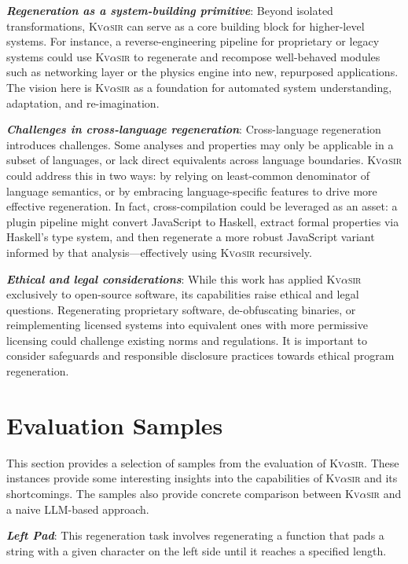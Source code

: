\documentclass[nonacm,sigplan,review]{acmart}
\newcommand{\sys}{{\scshape Kv{$\alpha$}sir}\xspace}
\newcommand{\heading}[1]{\vspace{2pt}\noindent\textbf{\emph{#1}}:\enspace}
\begin{document}
\heading{Regeneration as a system-building primitive}
Beyond isolated transformations, \sys can serve as a core building block for
higher-level systems.
For instance, a reverse-engineering pipeline for
proprietary or legacy systems could use \sys to regenerate and recompose
well-behaved modules such as networking layer or the physics engine into new,
repurposed applications.
The vision here is \sys as a foundation for automated system understanding, adaptation, and re-imagination.

\heading{Challenges in cross-language regeneration}
Cross-language regeneration introduces challenges.
Some analyses and
properties may only be applicable in a subset of languages, or lack direct
equivalents across language boundaries.
\sys could address this in two ways: by
relying on least-common denominator of language semantics, or by
embracing language-specific features to drive more effective regeneration.
In
fact, cross-compilation could be leveraged as an asset: a plugin pipeline might
convert JavaScript to Haskell, extract formal properties via Haskell’s type
system, and then regenerate a more robust JavaScript variant informed by that
analysis---effectively using \sys recursively.

\heading{Ethical and legal considerations}
While this work has applied \sys exclusively to open-source software, its
capabilities raise ethical and legal questions. Regenerating
proprietary software, de-obfuscating binaries, or reimplementing licensed
systems into equivalent ones with more permissive licensing 
could challenge existing norms and
regulations. 
It is important to consider
safeguards and responsible disclosure practices towards ethical program regeneration.




\appendix

\section{Evaluation Samples}
This section provides a selection of samples from the evaluation of \sys.
These instances provide some interesting insights into the capabilities of \sys and its shortcomings.
The samples also provide concrete comparison between \sys and a naive LLM-based approach.

\heading{Left Pad}
This regeneration task involves regenerating a
function that pads a string with a given character on the left side until it
reaches a specified length.
\end{document}
